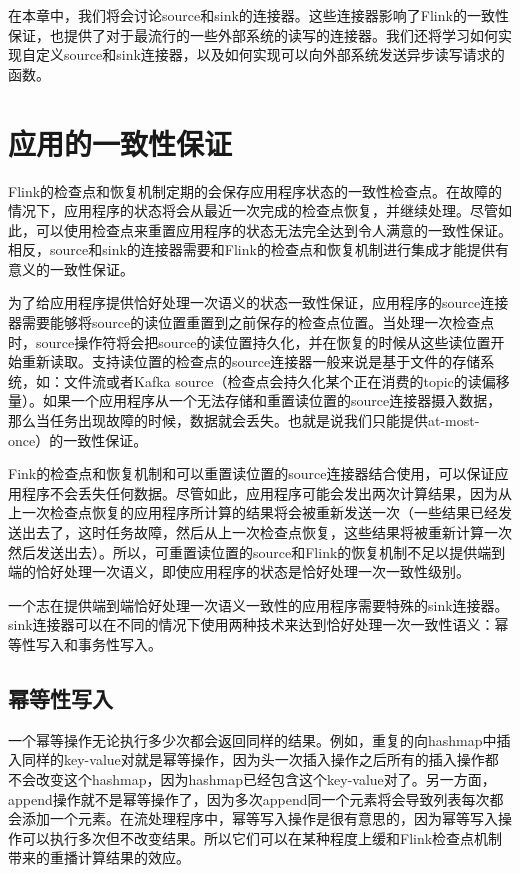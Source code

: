 \documentclass[cn,11pt,chinese]{elegantbook}
\begin{document}
在本章中，我们将会讨论source和sink的连接器。这些连接器影响了Flink的一致性保证，也提供了对于最流行的一些外部系统的读写的连接器。我们还将学习如何实现自定义source和sink连接器，以及如何实现可以向外部系统发送异步读写请求的函数。

\hypertarget{ux5e94ux7528ux7684ux4e00ux81f4ux6027ux4fddux8bc1}{%
\section{应用的一致性保证}\label{ux5e94ux7528ux7684ux4e00ux81f4ux6027ux4fddux8bc1}}

Flink的检查点和恢复机制定期的会保存应用程序状态的一致性检查点。在故障的情况下，应用程序的状态将会从最近一次完成的检查点恢复，并继续处理。尽管如此，可以使用检查点来重置应用程序的状态无法完全达到令人满意的一致性保证。相反，source和sink的连接器需要和Flink的检查点和恢复机制进行集成才能提供有意义的一致性保证。

为了给应用程序提供恰好处理一次语义的状态一致性保证，应用程序的source连接器需要能够将source的读位置重置到之前保存的检查点位置。当处理一次检查点时，source操作符将会把source的读位置持久化，并在恢复的时候从这些读位置开始重新读取。支持读位置的检查点的source连接器一般来说是基于文件的存储系统，如：文件流或者Kafka
source（检查点会持久化某个正在消费的topic的读偏移量）。如果一个应用程序从一个无法存储和重置读位置的source连接器摄入数据，那么当任务出现故障的时候，数据就会丢失。也就是说我们只能提供at-most-once）的一致性保证。

Fink的检查点和恢复机制和可以重置读位置的source连接器结合使用，可以保证应用程序不会丢失任何数据。尽管如此，应用程序可能会发出两次计算结果，因为从上一次检查点恢复的应用程序所计算的结果将会被重新发送一次（一些结果已经发送出去了，这时任务故障，然后从上一次检查点恢复，这些结果将被重新计算一次然后发送出去）。所以，可重置读位置的source和Flink的恢复机制不足以提供端到端的恰好处理一次语义，即使应用程序的状态是恰好处理一次一致性级别。

一个志在提供端到端恰好处理一次语义一致性的应用程序需要特殊的sink连接器。sink连接器可以在不同的情况下使用两种技术来达到恰好处理一次一致性语义：幂等性写入和事务性写入。

\hypertarget{ux5e42ux7b49ux6027ux5199ux5165}{%
\subsection{幂等性写入}\label{ux5e42ux7b49ux6027ux5199ux5165}}

一个幂等操作无论执行多少次都会返回同样的结果。例如，重复的向hashmap中插入同样的key-value对就是幂等操作，因为头一次插入操作之后所有的插入操作都不会改变这个hashmap，因为hashmap已经包含这个key-value对了。另一方面，append操作就不是幂等操作了，因为多次append同一个元素将会导致列表每次都会添加一个元素。在流处理程序中，幂等写入操作是很有意思的，因为幂等写入操作可以执行多次但不改变结果。所以它们可以在某种程度上缓和Flink检查点机制带来的重播计算结果的效应。
\end{document}
